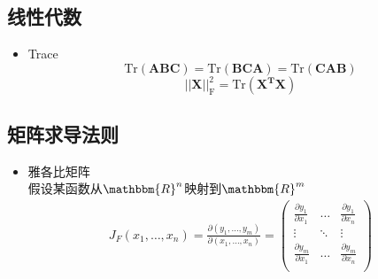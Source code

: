 \documentclass{article} 	%
\begin{document}
	\subsection{线性代数}
		\begin{itemize}
		\item
		Trace\\
		$$\mathrm{Tr}(\mathbf{ABC}) = \mathrm{Tr}(\mathbf{BCA}) =\mathrm{Tr}(\mathbf{CAB})$$ 
		$$||\mathbf{X}||^2_{\mathrm{F}} = \mathrm{Tr}(\mathbf{X^TX})$$
		\end{itemize}
	\subsection{矩阵求导法则}
		\begin{itemize}
		\item
		雅各比矩阵\\
		假设某函数从$\mathbbm{R}^n$映射到$\mathbbm{R}^m$
		\begin{eqnarray}
		J_{F}(x_1,\ldots,x_n) = \frac{\partial(y_1,\ldots,y_m)}{\partial(x_1,\ldots,x_n)} =
		\left(
			\begin{array}{ccc}
			\frac{\partial y_1}{\partial x_1}&\ldots&\frac{\partial y_1}{\partial x_n}\\
			\vdots&\ddots&\vdots\\
			\frac{\partial y_m}{\partial x_1}&\ldots&\frac{\partial y_m}{\partial x_n}\\
			\end{array}
		\right)
		\end{eqnarray}
		

\end{itemize}
\end{document}
